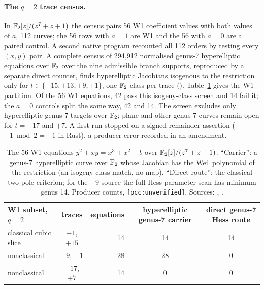 \paragraph{The $q=2$ trace census.} In $\mathbb{F}_2[z]/(z^7+z+1)$ the census pairs
56 W1 coefficient values with both values of $a$, 112 curves; the 56 rows
with $a=1$ are W1 and the 56 with $a=0$ are a paired control. A second
native program recounted all 112 orders by testing every $(x,y)$ pair. A
complete census of 294{,}912 normalised genus-7 hyperelliptic equations over
$\mathbb{F}_2$ over the nine admissible branch supports, reproduced by a separate
direct counter, finds hyperelliptic Jacobians isogenous to the restriction
only for $t\in\{\pm15,\pm13,\pm9,\pm1\}$, one $\mathbb{F}_2$-class per trace
().
Table~\ref{tab:bt-ghs7} gives the W1 partition. Of the 56 W1 equations, 42
pass this isogeny-class screen and 14 fail it; the $a=0$ controls split the
same way, 42 and 14. The screen excludes only hyperelliptic genus-7
targets over $\mathbb{F}_2$; plane and other genus-7 curves remain open for $t=-17$
and $+7$. A first run stopped on a signed-remainder assertion
($-1\bmod2=-1$ in Rust), a producer error recorded in an amendment.

\begin{table}[t]
\centering\small
\begin{tabular}{@{}lcrcc@{}}
\toprule
W1 subset, $q=2$ & traces & equations & hyperelliptic genus-7 carrier & direct genus-7 Hess route \\
\midrule
classical cubic slice & $-1$, $+15$ & 14 & 14 & 14 \\
nonclassical & $-9$, $-1$ & 28 & 28 & 0 \\
nonclassical & $-17$, $+7$ & 14 & 0 & 0 \\
\bottomrule
\end{tabular}
\caption[]{The 56 W1 equations $y^2+xy=x^3+x^2+b$ over
$\mathbb{F}_2[z]/(z^7+z+1)$. ``Carrier'': a genus-7 hyperelliptic curve over $\mathbb{F}_2$
whose Jacobian has the Weil polynomial of the restriction (an isogeny-class
match, no map). ``Direct route'': the classical two-pole criterion; for the
$-9$ source the full Hess parameter scan has minimum genus 14. Producer
counts, \texttt{[pcc:unverified]}. Sources:
,
.}
\label{tab:bt-ghs7}
\end{table}

